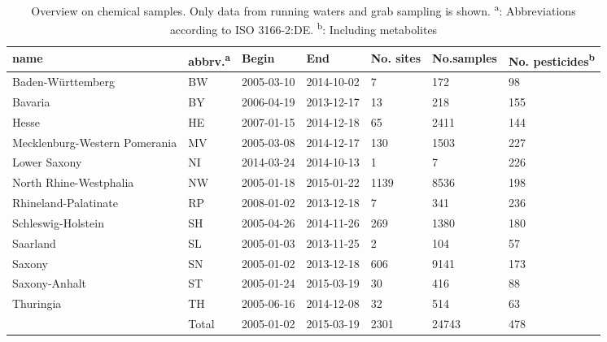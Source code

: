 \begin{sidewaystable}[H]
\centering
\caption[Overview on chemical samples.]{Overview on chemical samples. Only data from running waters and grab
sampling is shown. \textsuperscript{a}: Abbreviations according to ISO 3166-2:DE. 
      \textsuperscript{b}: Including metabolites}\label{tab:phch_overview}
\begin{tabular}{p{2.7cm}lllR{2cm}R{2cm}R{2cm}}
  \toprule
name & abbrv.\textsuperscript{a} & Begin & End & No. sites & No.samples & No. pesticides\textsuperscript{b} \\ 
  \midrule
Baden-Württemberg & BW & 2005-03-10 & 2014-10-02 & 7 & 172 & 98 \\ 
  Bavaria & BY & 2006-04-19 & 2013-12-17 & 13 & 218 & 155 \\ 
  Hesse & HE & 2007-01-15 & 2014-12-18 & 65 & 2411 & 144 \\ 
  Mecklenburg-Western Pomerania & MV & 2005-03-08 & 2014-12-17 & 130 & 1503 & 227 \\ 
  Lower Saxony & NI & 2014-03-24 & 2014-10-13 & 1 & 7 & 226 \\ 
  North Rhine-Westphalia & NW & 2005-01-18 & 2015-01-22 & 1139 & 8536 & 198 \\ 
  Rhineland-Palatinate & RP & 2008-01-02 & 2013-12-18 & 7 & 341 & 236 \\ 
  Schleswig-Holstein & SH & 2005-04-26 & 2014-11-26 & 269 & 1380 & 180 \\ 
  Saarland & SL & 2005-01-03 & 2013-11-25 & 2 & 104 & 57 \\ 
  Saxony & SN & 2005-01-02 & 2013-12-18 & 606 & 9141 & 173 \\ 
  Saxony-Anhalt & ST & 2005-01-24 & 2015-03-19 & 30 & 416 & 88 \\ 
  Thuringia & TH & 2005-06-16 & 2014-12-08 & 32 & 514 & 63 \\ 
   \midrule
 & Total & 2005-01-02 & 2015-03-19 & 2301 & 24743 & 478 \\ 
   \bottomrule
\end{tabular}
\end{sidewaystable}
